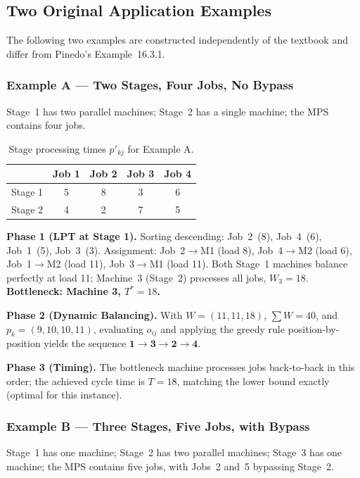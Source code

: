 \documentclass[11pt,a4paper]{article}
\begin{document}
\subsection{Two Original Application Examples}

The following two examples are constructed independently of the textbook
and differ from Pinedo's Example~16.3.1.

\subsubsection*{Example A --- Two Stages, Four Jobs, No Bypass}

Stage~1 has two parallel machines; Stage~2 has a single machine; the MPS
contains four jobs.

\begin{table}[h!]
\centering
\begin{tabular}{@{}lcccc@{}}
\toprule
 & Job 1 & Job 2 & Job 3 & Job 4 \\
\midrule
Stage 1 & 5 & 8 & 3 & 6 \\
Stage 2 & 4 & 2 & 7 & 5 \\
\bottomrule
\end{tabular}
\caption{Stage processing times $p'_{kj}$ for Example A.}
\end{table}

\textbf{Phase 1 (LPT at Stage 1).} Sorting descending: Job~2~(8), Job~4~(6),
Job~1~(5), Job~3~(3). Assignment: Job~2$\to$M1 (load 8), Job~4$\to$M2 (load
6), Job~1$\to$M2 (load 11), Job~3$\to$M1 (load 11). Both Stage~1 machines
balance perfectly at load 11; Machine~3 (Stage~2) processes all jobs,
$W_3 = 18$. \textbf{Bottleneck: Machine 3, $T^\ast = 18$.}

\textbf{Phase 2 (Dynamic Balancing).} With $W=(11,11,18)$, $\sum W = 40$,
and $p_k=(9,10,10,11)$, evaluating $o_{ij}$ and applying the greedy rule
position-by-position yields the sequence $\mathbf{1 \to 3 \to 2 \to 4}$.

\textbf{Phase 3 (Timing).} The bottleneck machine processes jobs
back-to-back in this order; the achieved cycle time is $T = 18$, matching
the lower bound exactly (optimal for this instance).

\subsubsection*{Example B --- Three Stages, Five Jobs, with Bypass}

Stage~1 has one machine; Stage~2 has two parallel machines; Stage~3 has one
machine; the MPS contains five jobs, with Jobs~2 and~5 bypassing Stage~2.
\end{document}
